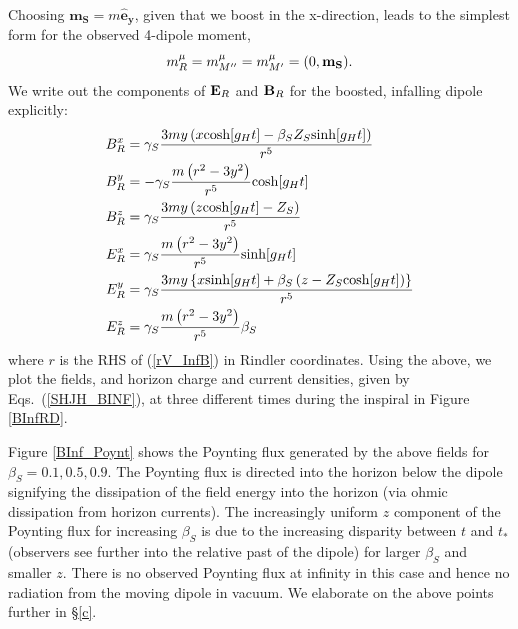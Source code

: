 Choosing $\mathbf{m_S} = m \mathbf{\hat{e}_y}$, given that we boost in
the x-direction, leads to the simplest form for the observed 4-dipole moment,
\begin{equation}
m_R^\mu= m_{M^{\prime \prime}}^\mu= 
m_{M^{\prime}}^\mu=
 (0,{\bf m_S}).
\end{equation}
We write out the components of ${\bf E}_R$ and ${\bf B}_R$ for the boosted, infalling dipole explicitly:
\begin{align}
B_R^{x} &= \gamma_S \frac{ 3m y \left(  x \hbox{cosh}[g_H t] -\beta_S Z_S \hbox{sinh}[g_H t] \right)}{r^5} \nonumber\\
B_R^{y} &= - \gamma_S \frac{ m \left(r^2 -3 y^2 \right)}{r^5}  \hbox{cosh}[g_H t]  \nonumber\\
B_R^{z} &=   \gamma_S \frac{3 m y\left(z \hbox{cosh}[g_H t] - Z_S \right)}{r^5}   \nonumber\\
E_R^{x} &= \gamma_S \frac{ m \left( r^2 - 3y^2 \right)}{r^5} \hbox{sinh}[g_H t]  \nonumber\\
E_R^{y} &=  \gamma_S \frac{3 m y \left\{ x \hbox{sinh}[g_H t] + \beta_S \left(z - Z_S \hbox{cosh}[g_H t]  \right)  \right\} }{r^5} \nonumber\\
E_R^{z} &=  \gamma_S \frac{ m \left(  r^2 - 3y^2 \right)}{r^5} \beta_S 
\label{InfBoostEB}
\end{align}
where $r$ is the RHS of (\ref{rV_InfB}) in Rindler coordinates. Using the above, we plot the fields, and horizon charge and current densities, given by Eqs.\  (\ref{SHJH_BINF}), at three different times during the inspiral in Figure \ref{BInfRD}. 


Figure \ref{BInf_Poynt} shows the Poynting flux generated by the above
fields for $\beta_S = 0.1, 0.5, 0.9$. The Poynting flux is directed
into the horizon below the dipole signifying the dissipation of the
field energy into the horizon (via ohmic dissipation from horizon
currents). The increasingly uniform $z$ component of the Poynting flux
for increasing $\beta_S$ is due to the increasing disparity between
$t$ and $t_*$ (observers see further into the relative past of the dipole) for larger $\beta_S$ and smaller $z$. There is no
observed Poynting flux at infinity in this case and hence no radiation
from the moving dipole in vacuum. We elaborate on the above points further in  \S\ref{c}. 

